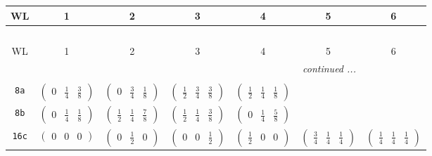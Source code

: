 \documentclass[fleqn,9pt,landscape]{jsarticle}
\begin{document}
\begin{center}
\renewcommand{\arraystretch}{1.2}
\begin{longtable}{ccccccc}
 \hline \hline
WL & 1 & 2 & 3 & 4 & 5 & 6 \\ \hline \endfirsthead

\multicolumn{6}{l}{\tablename\ \thetable{}} \\
 \hline \hline
WL & 1 & 2 & 3 & 4 & 5 & 6 \\ \hline \endhead

 \hline \hline
\multicolumn{6}{r}{\footnotesize\it continued ...} \\ \endfoot

 \hline \hline
\multicolumn{6}{r}{} \\ \endlastfoot

{\tt 8a} & $ \begin{pmatrix} 0 & \frac{1}{4} & \frac{3}{8} \end{pmatrix} $ & $ \begin{pmatrix} 0 & \frac{3}{4} & \frac{1}{8} \end{pmatrix} $ & $ \begin{pmatrix} \frac{1}{2} & \frac{3}{4} & \frac{3}{8} \end{pmatrix} $ & $ \begin{pmatrix} \frac{1}{2} & \frac{1}{4} & \frac{1}{8} \end{pmatrix} $ & $  $ & $  $ \\ \hline
{\tt 8b} & $ \begin{pmatrix} 0 & \frac{1}{4} & \frac{1}{8} \end{pmatrix} $ & $ \begin{pmatrix} \frac{1}{2} & \frac{1}{4} & \frac{7}{8} \end{pmatrix} $ & $ \begin{pmatrix} \frac{1}{2} & \frac{1}{4} & \frac{3}{8} \end{pmatrix} $ & $ \begin{pmatrix} 0 & \frac{1}{4} & \frac{5}{8} \end{pmatrix} $ & $  $ & $  $ \\ \hline
{\tt 16c} & $ \begin{pmatrix} 0 & 0 & 0 \end{pmatrix} $ & $ \begin{pmatrix} 0 & \frac{1}{2} & 0 \end{pmatrix} $ & $ \begin{pmatrix} 0 & 0 & \frac{1}{2} \end{pmatrix} $ & $ \begin{pmatrix} \frac{1}{2} & 0 & 0 \end{pmatrix} $ & $ \begin{pmatrix} \frac{3}{4} & \frac{1}{4} & \frac{1}{4} \end{pmatrix} $ & $ \begin{pmatrix} \frac{1}{4} & \frac{1}{4} & \frac{1}{4} \end{pmatrix} $ \\

\end{longtable}
\end{center}
\end{document}
